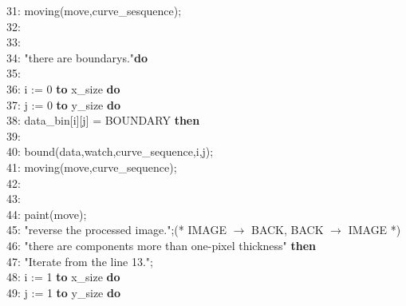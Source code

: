 \documentclass[a4paper,10pt]{jarticle}
\begin{document}
31: \hspace{3.5cm}moving(move,curve\_sesquence);\\
32: \hspace{3cm}{\bfseries end}\\
33: \hspace{0.5cm}{\bfseries else}\\
34: \hspace{1cm}{\bfseries while} "there are boundarys."{\bfseries do}\\
35: \hspace{1.5cm}{\bfseries begin}\\
36: \hspace{2cm}{\bfseries for} i := 0 {\bfseries to} x\_size {\bfseries do}\\
37: \hspace{2.5cm}{\bfseries for} j := 0 {\bfseries to} y\_size {\bfseries do}\\
38: \hspace{3cm}{\bfseries if} data\_bin[i][j] = BOUNDARY {\bfseries then}\\
39: \hspace{3.5cm}{\bfseries begin}\\
40: \hspace{4cm}bound(data,watch,curve\_sequence,i,j);\\
41: \hspace{4cm}moving(move,curve\_sequence);\\
42: \hspace{3.5cm}{\bfseries end}\\
43: \hspace{1.5cm}{\bfseries end}\\
44: \hspace{0.5cm}paint(move);\\
45: \hspace{0.5cm}"reverse the processed image.";(* IMAGE $\to$ BACK, BACK $\to$ IMAGE *)\\
46: \hspace{0.5cm}{\bfseries if} "there are components more than one-pixel thickness" {\bfseries then}\\
47: \hspace{1cm}"Iterate from the line 13.";\\
48: \hspace{0.5cm}{\bfseries for} i := 1 {\bfseries to} x\_size {\bfseries do}\\
49: \hspace{1cm}{\bfseries for} j := 1 {\bfseries to} y\_size {\bfseries do}\\
\end{document}
